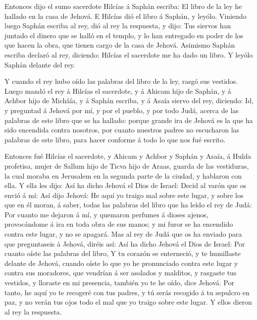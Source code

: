  Entonces dijo el sumo sacerdote Hilcías á Saphán escriba:
El libro de la ley he hallado en la casa de Jehová. E Hilcías dió el
libro á Saphán, y leyólo.  Viniendo luego Saphán escriba al
rey, dió al rey la respuesta, y dijo: Tus siervos han juntado el dinero
que se halló en el templo, y lo han entregado en poder de los que hacen
la obra, que tienen cargo de la casa de Jehová.  Asimismo
Saphán escriba declaró al rey, diciendo: Hilcías el sacerdote me ha dado
un libro. Y leyólo Saphán delante del rey.

 Y cuando el rey hubo oído las palabras del libro de la
ley, rasgó sus vestidos.  Luego mandó el rey á Hilcías el
sacerdote, y á Ahicam hijo de Saphán, y á Achbor hijo de Michâía, y á
Saphán escriba, y á Asaía siervo del rey, diciendo:  Id, y
preguntad á Jehová por mí, y por el pueblo, y por todo Judá, acerca de
las palabras de este libro que se ha hallado: porque grande ira de
Jehová es la que ha sido encendida contra nosotros, por cuanto nuestros
padres no escucharon las palabras de este libro, para hacer conforme á
todo lo que nos fué escrito.

 Entonces fué Hilcías el sacerdote, y Ahicam y Achbor y
Saphán y Asaía, á Hulda profetisa, mujer de Sallum hijo de Ticva hijo de
Araas, guarda de las vestiduras, la cual moraba en Jerusalem en la
segunda parte de la ciudad, y hablaron con ella.  Y ella
les dijo: Así ha dicho Jehová el Dios de Israel: Decid al varón que os
envió á mí:  Así dijo Jehová: He aquí yo traigo mal sobre
este lugar, y sobre los que en él moran, á saber, todas las palabras del
libro que ha leído el rey de Judá:  Por cuanto me dejaron á
mí, y quemaron perfumes á dioses ajenos, provocándome á ira en toda obra
de sus manos; y mi furor se ha encendido contra este lugar, y no se
apagará.  Mas al rey de Judá que os ha enviado para que
preguntaseis á Jehová, diréis así: Así ha dicho Jehová el Dios de
Israel: Por cuanto oíste las palabras del libro,  Y tu
corazón se enterneció, y te humillaste delante de Jehová, cuando oíste
lo que yo he pronunciado contra este lugar y contra sus moradores, que
vendrían á ser asolados y malditos, y rasgaste tus vestidos, y lloraste
en mi presencia, también yo te he oído, dice Jehová.  Por
tanto, he aquí yo te recogeré con tus padres, y tú serás recogido á tu
sepulcro en paz, y no verán tus ojos todo el mal que yo traigo sobre
este lugar. Y ellos dieron al rey la respuesta.

